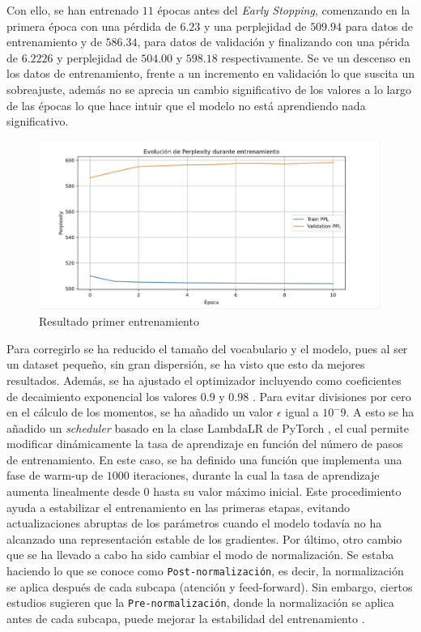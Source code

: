 \documentclass[11pt]{book}
\begin{document}
Con ello, se han entrenado $11$ épocas antes del \textit{Early Stopping}, comenzando en la primera época con una pérdida de $6.23$ y una perplejidad de  $509.94$ para datos de entrenamiento y de $586.34$, para datos de validación y finalizando con una périda de $6.2226$ y perplejidad de $504.00$ y $598.18$ respectivamente. Se ve un descenso en los datos de entrenamiento, frente a un incremento en validación lo que suscita un sobreajuste, además no se aprecia un cambio significativo de los valores a lo largo de las épocas lo que hace intuir que el modelo no está aprendiendo nada significativo.

\begin{figure}[h]
    \centering
    \includegraphics[width=0.5\linewidth]{img/resultado_entrenamiento_v1.png}
    \caption{Resultado primer entrenamiento}
    \label{fig:placeholder24}
\end{figure}

Para corregirlo se ha reducido el tamaño del vocabulario y el modelo, pues al ser un dataset pequeño, sin gran dispersión, se ha visto que esto da mejores resultados. Además, se ha ajustado el optimizador incluyendo como coeficientes de decaimiento exponencial los valores $0.9$ y $0.98$ \parencite{reddit_transformer_not_learning}. Para evitar divisiones por cero en el cálculo de los momentos, se ha añadido un valor $\epsilon$ igual a $10^-9$. A esto se ha añadido un \textit{scheduler} basado en la clase LambdaLR de PyTorch \parencite{pytorch_adjust_lr}, el cual permite modificar dinámicamente la tasa de aprendizaje en función del número de pasos de entrenamiento. En este caso, se ha definido una función que implementa una fase de warm-up de $1000$ iteraciones, durante la cual la tasa de aprendizaje aumenta linealmente desde 0 hasta su valor máximo inicial. Este procedimiento ayuda a estabilizar el entrenamiento en las primeras etapas, evitando actualizaciones abruptas de los parámetros cuando el modelo todavía no ha alcanzado una representación estable de los gradientes. Por último, otro cambio que se ha llevado a cabo ha sido cambiar el modo de normalización. Se estaba haciendo lo que se conoce como \texttt{Post-normalización}, es decir, la normalización se aplica después de cada subcapa (atención y feed-forward). Sin embargo, ciertos estudios sugieren que la \texttt{Pre-normalización}, donde la normalización se aplica antes de cada subcapa, puede mejorar la estabilidad del entrenamiento \parencite{doherty2024_hownot}.
\end{document}
